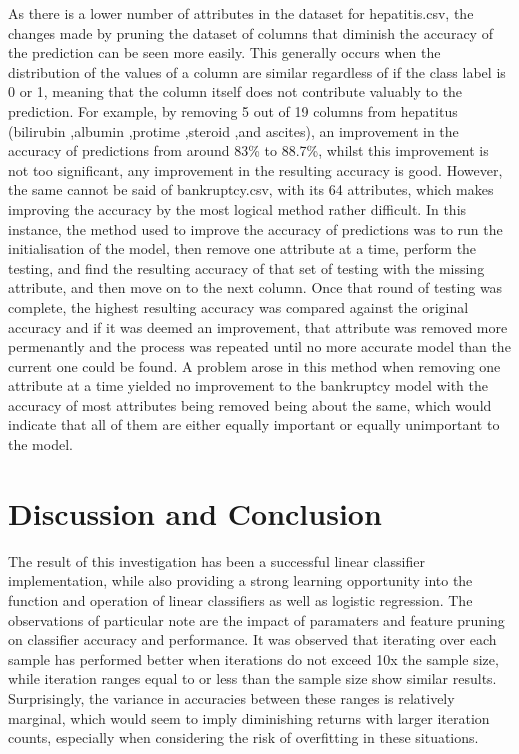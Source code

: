 As there is a lower number of attributes in the dataset for hepatitis.csv, the changes made by pruning the dataset of columns that diminish the accuracy of the prediction can be seen more easily. This generally occurs when the distribution of the values of a column are similar regardless of if the class label is 0 or 1, meaning that the column itself does not contribute valuably to the prediction. For example, by removing 5 out of 19 columns from hepatitus (bilirubin ,albumin ,protime ,steroid ,and ascites), an improvement in the accuracy of predictions from around 83\% to 88.7\%, whilst this improvement is not too significant, any improvement in the resulting accuracy is good. However, the same cannot be said of bankruptcy.csv, with its 64 attributes, which makes improving the accuracy by the most logical method rather difficult. In this instance, the method used to improve the accuracy of predictions was to run the initialisation of the model, then remove one attribute at a time, perform the testing, and find the resulting accuracy of that set of testing with the missing attribute, and then move on to the next column. Once that round of testing was complete, the highest resulting accuracy was compared against the original accuracy and if it was deemed an improvement, that attribute was removed more permenantly and the process was repeated until no more accurate model than the current one could be found. A problem arose in this method when removing one attribute at a time yielded no improvement to the bankruptcy model with the accuracy of most attributes being removed being about the same, which would indicate that all of them are either equally important or equally unimportant to the model.\\

\section{Discussion and Conclusion}

The result of this investigation has been a successful linear classifier implementation, while also providing a strong learning opportunity into the function and operation of linear classifiers as well as logistic regression. The observations of particular note are the impact of paramaters and feature pruning on classifier accuracy and performance. It was observed that iterating over each sample has performed better when iterations do not exceed 10x the sample size, while iteration ranges equal to or less than the sample size show similar results. Surprisingly, the variance in accuracies between these ranges is relatively marginal, which would seem to imply diminishing returns with larger iteration counts, especially when considering the risk of overfitting in these situations.\\

